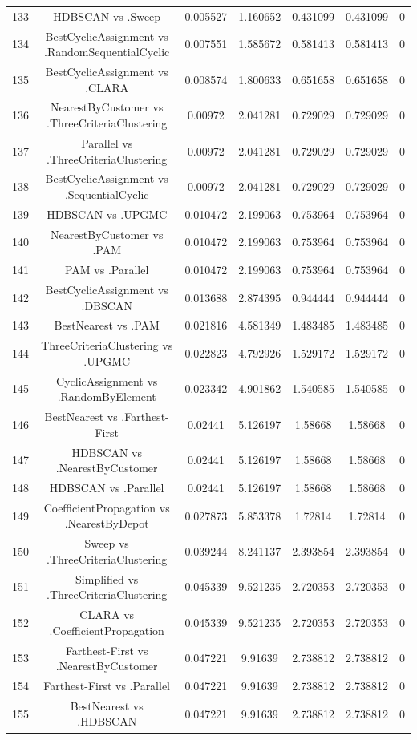\documentclass[a4paper,10pt]{article}
\begin{document}
\begin{landscape}
\begin{table}[!htp]
\begin{tabular}{ccccccc}
133&HDBSCAN vs .Sweep&0.005527&1.160652&0.431099&0.431099&0\\
134&BestCyclicAssignment vs .RandomSequentialCyclic&0.007551&1.585672&0.581413&0.581413&0\\
135&BestCyclicAssignment vs .CLARA&0.008574&1.800633&0.651658&0.651658&0\\
136&NearestByCustomer vs .ThreeCriteriaClustering&0.00972&2.041281&0.729029&0.729029&0\\
137&Parallel vs .ThreeCriteriaClustering&0.00972&2.041281&0.729029&0.729029&0\\
138&BestCyclicAssignment vs .SequentialCyclic&0.00972&2.041281&0.729029&0.729029&0\\
139&HDBSCAN vs .UPGMC&0.010472&2.199063&0.753964&0.753964&0\\
140&NearestByCustomer vs .PAM&0.010472&2.199063&0.753964&0.753964&0\\
141&PAM vs .Parallel&0.010472&2.199063&0.753964&0.753964&0\\
142&BestCyclicAssignment vs .DBSCAN&0.013688&2.874395&0.944444&0.944444&0\\
143&BestNearest vs .PAM&0.021816&4.581349&1.483485&1.483485&0\\
144&ThreeCriteriaClustering vs .UPGMC&0.022823&4.792926&1.529172&1.529172&0\\
145&CyclicAssignment vs .RandomByElement&0.023342&4.901862&1.540585&1.540585&0\\
146&BestNearest vs .Farthest-First&0.02441&5.126197&1.58668&1.58668&0\\
147&HDBSCAN vs .NearestByCustomer&0.02441&5.126197&1.58668&1.58668&0\\
148&HDBSCAN vs .Parallel&0.02441&5.126197&1.58668&1.58668&0\\
149&CoefficientPropagation vs .NearestByDepot&0.027873&5.853378&1.72814&1.72814&0\\
150&Sweep vs .ThreeCriteriaClustering&0.039244&8.241137&2.393854&2.393854&0\\
151&Simplified vs .ThreeCriteriaClustering&0.045339&9.521235&2.720353&2.720353&0\\
152&CLARA vs .CoefficientPropagation&0.045339&9.521235&2.720353&2.720353&0\\
153&Farthest-First vs .NearestByCustomer&0.047221&9.91639&2.738812&2.738812&0\\
154&Farthest-First vs .Parallel&0.047221&9.91639&2.738812&2.738812&0\\
155&BestNearest vs .HDBSCAN&0.047221&9.91639&2.738812&2.738812&0\\

\end{tabular}
\end{table}
\end{landscape}
\end{document}
